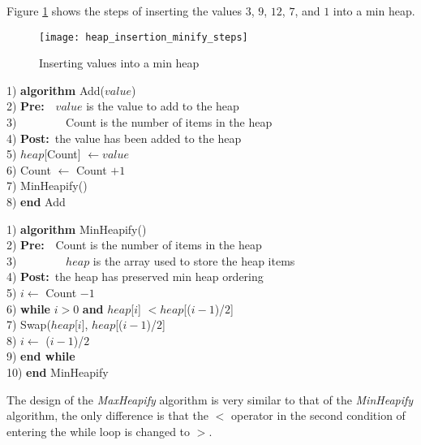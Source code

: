 Figure \ref{fig:heap_insertion_minify_steps} shows the steps of inserting the values $3$, $9$, $12$, $7$, and $1$ into a min heap.

\begin{figure}
\begin{center}
\texttt{[image: heap\_insertion\_minify\_steps]}
\end{center}
\caption{Inserting values into a min heap} \label{fig:heap_insertion_minify_steps}
\end{figure}

\newpage
\begin{tabbing}
1)  \textbf{alg}\= \textbf{orithm} Add($value$) \\
2)  \> \textbf{Pre:}~~$value$ is the value to add to the heap \\
3)  \> ~~~~~~~~Count is the number of items in the heap \\
4)  \> \textbf{Post:}~the value has been added to the heap \\
5)  \> $heap$[Count] $\leftarrow value$ \\
6)  \> Count $\leftarrow$ Count $+ 1$ \\
7)  \> MinHeapify() \\
8)  \textbf{end} Add \\
\end{tabbing}

\begin{tabbing}
1)  \textbf{alg}\= \textbf{orithm} MinHeapify() \\
2)  \> \textbf{Pre:}~~Count is the number of items in the heap \\
3)  \> ~~~~~~~~$heap$ is the array used to store the heap items \\
4)  \> \textbf{Post:}~the heap has preserved min heap ordering \\
5)  \> $i \leftarrow$ Count $- 1$ \\
6)  \> \textbf{whi}\= \textbf{le} $i > 0$ \textbf{and} $heap$[$i$] $< heap$[($i - 1$)/$2$] \\
7)  \> \> Swap($heap$[$i$], $heap$[($i - 1$)/$2$] \\
8)  \> \> $i \leftarrow$ ($i - 1$)/$2$ \\
9)  \> \textbf{end while} \\
10) \textbf{end} MinHeapify \\
\end{tabbing}

The design of the \textit{MaxHeapify} algorithm is very similar to that of the \textit{MinHeapify} algorithm, the only difference is that the $<$ operator in the second condition of entering the while loop is changed to $>$. 

